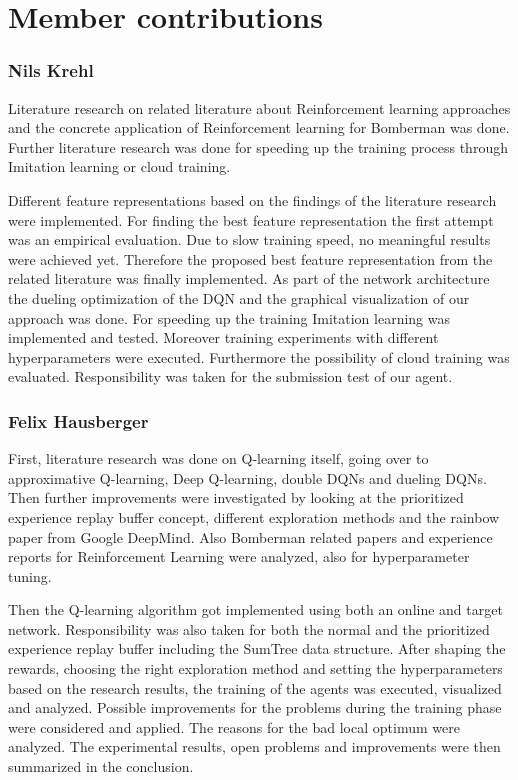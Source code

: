 \section*{Member contributions}

\subsubsection*{Nils Krehl}

Literature research on related literature about Reinforcement learning approaches and the concrete application of Reinforcement learning for Bomberman was done. Further literature research was done for speeding up the training process through Imitation learning or cloud training.

Different feature representations based on the findings of the literature research were implemented. For finding the best feature representation the first attempt was an empirical evaluation. Due to slow training speed, no meaningful results were achieved yet. Therefore the proposed best feature representation from the related literature was finally implemented.
As part of the network architecture the dueling optimization of the DQN and the graphical visualization of our approach was done.
For speeding up the training Imitation learning was implemented and tested.
Moreover training experiments with different hyperparameters were executed.
Furthermore the possibility of cloud training was evaluated.
Responsibility was taken for the submission test of our agent.

\subsubsection*{Felix Hausberger}

First, literature research was done on Q-learning itself, going over to approximative Q-learning, Deep Q-learning, double DQNs and dueling DQNs. Then further improvements were investigated by looking at the prioritized experience replay buffer concept, different exploration methods and the rainbow paper from Google DeepMind. Also Bomberman related papers and experience reports for Reinforcement Learning were analyzed, also for hyperparameter tuning. 

Then the Q-learning algorithm got implemented using both an online and target network. Responsibility was also taken for both the normal and the prioritized experience replay buffer including the SumTree data structure. After shaping the rewards, choosing the right exploration method and setting the hyperparameters based on the research results, the training of the agents was executed, visualized and analyzed. Possible improvements for the problems during the training phase were considered and applied. The reasons for the bad local optimum were analyzed. The experimental results, open problems and improvements were then summarized in the conclusion.
